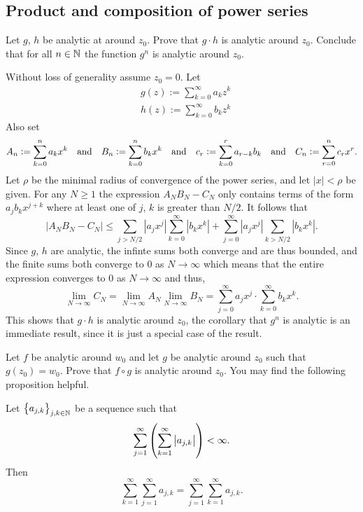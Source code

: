 \documentclass[11pt,a4paper]{article}
\begin{document}
\subsection{Product and composition of power series}
\label{ssec:products-compositions-of-power-series}
\begin{exercise}
  Let $g$, $h$ be analytic at around $z_0$.
  Prove that $g \cdot h$ is analytic around $z_0$.
  Conclude that for all $n \in \mathbb{N}$ the function $g^n$ is analytic around $z_0$.
\end{exercise}
\begin{solution}
  Without loss of generality assume $z_0 = 0$.
  Let
  \begin{align*}
    &g(z) := \sum_{k=0}^{\infty} a_k z^k \\
    &h(z) := \sum_{k=0}^{\infty} b_k z^k
  \end{align*}
  Also set
  \[
    A_n := \sum_{k=0}^n a_k x^k \quad \text{and} \quad
    B_n := \sum_{k=0}^n b_k x^k \quad \text{and} \quad
    c_r := \sum_{k=0}^r a_{r-k}b_k \quad \text{and} \quad
    C_n:=\sum_{r=0}^n c_r x^r.
  \]
  Let $\rho$ be the minimal radius of convergence of the power series,
  and let $|x| < \rho$ be given.
  For any $N \geq 1$ the expression $A_N B_N - C_N$ only contains terms
  of the form $a_j b_k x^{j + k}$ where at least one of $j$, $k$ is
  greater than $N / 2$.
  It follows that
  \[
    |A_N B_N - C_N| \le
    \sum_{j>N/2} |a_j x^j| \sum_{k=0}^\infty |b_k x^k| +
    \sum_{j=0}^\infty |a_jx^j| \sum_{k>N/2} |b_k x^k|.
  \]
  Since $g$, $h$ are analytic, the infinte sums both converge and are thus
  bounded, and the finite sums both converge to $0$ as $N \to \infty$
  which means that the entire expression converges to $0$ as $N \to \infty$
  and thus,
  \[
    \lim_{N \to \infty} C_N =
    \lim_{N \to \infty} A_N
    \lim_{N \to \infty} B_N =
    \sum_{j=0}^\infty a_j x^j \cdot \sum_{k=0}^\infty b_k x^k.
  \]
  This shows that $g \cdot h$ is analytic around $z_0$,
  the corollary that $g^n$ is analytic is an immediate result, since
  it is just a special case of the result.
\end{solution}

\begin{exercise}
  \label{ex:composition-of-analytic-is-analytic}
  Let $f$ be analytic around $w_0$ and let $g$ be analytic around $z_0$ such
  that $g(z_0) = w_0$.
  Prove that $f \circ g$ is analytic around $z_0$.
  You may find the following proposition helpful.
  \begin{proposition}
    Let $\left\{a_{j,k}\right\}_{j,k \in \mathbb{N}}$ be a sequence such that
    \[
      \sum_{j=1}^{\infty} \del{\sum_{k=1}^{\infty} \abs{a_{j,k}}} < \infty.
    \]
    Then
    \[
      \sum_{k=1}^{\infty} \sum_{j=1}^{\infty} a_{j,k} = 
      \sum_{j=1}^{\infty} \sum_{k=1}^{\infty} a_{j,k}.
    \]
  \end{proposition}
\end{exercise}
\begin{solution}

\end{solution}
\end{document}
